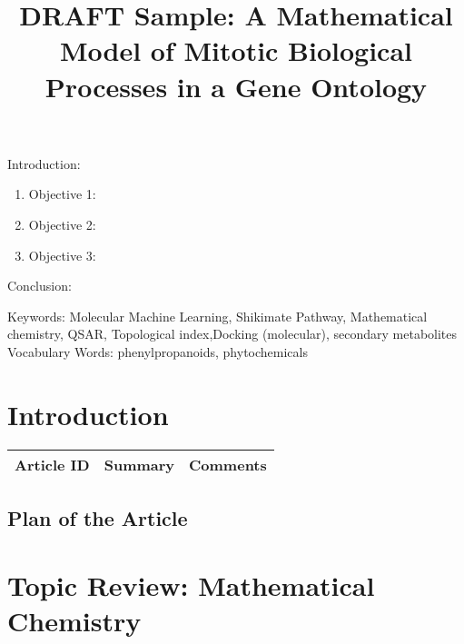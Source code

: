 


\twocolumn
\scriptsize
\begin{frontmatter}
		\title{DRAFT Sample: A Mathematical Model of Mitotic Biological Processes in a Gene Ontology}
		\author{}
		\address{The Mathematical Learning Space}
\end{frontmatter}	

Introduction:
\begin{enumerate}
\item Objective 1:
\item Objective 2:
\item Objective 3:
\end{enumerate}
Conclusion:

Keywords:  Molecular Machine Learning, Shikimate Pathway, Mathematical chemistry, QSAR, Topological index,Docking (molecular), secondary  metabolites
Vocabulary Words: phenylpropanoids, phytochemicals

\section{Introduction}

\begin{table}[H]\centering
	\begin{tabular}{p{1cm}p{4cm}p{3cm}}
		Article ID & Summary & Comments\\
		\hline
		\hline
	\end{tabular}
\end{table}


\subsection{Plan of the Article}

\begin{enumerate}
\end{enumerate}

\section{Topic Review: Mathematical Chemistry}

